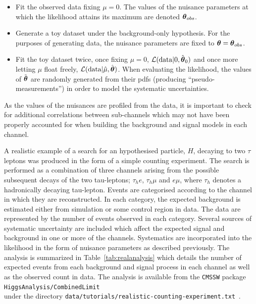 \begin{itemize}
\item{Fit the observed data fixing $\mu=0$. The values of the nuisance parameters 
at which the likelihood attains its maximum are denoted ${\boldsymbol{\theta}}_{obs}$.}
\item{Generate a toy dataset under the background-only hypothesis. For the purposes of
generating data, the nuisance parameters are fixed to ${\boldsymbol{\theta}}={\boldsymbol{\theta}}_{obs}$.}
\item{Fit the toy dataset twice, once fixing $\mu=0$, $\mathcal{L}(\mathrm{data}|0,\hat{{\boldsymbol{\theta}}}_{0})$ 
and once more letting 
$\mu$ float freely, $\mathcal{L}(\mathrm{data}|\hat{\mu},\hat{{\boldsymbol{\theta}}})$. When 
evaluating the likelihood, the values of $\tilde{{\boldsymbol{\theta}}}$ are randomly generated from their pdfs
(producing ``pseudo-measurements'') in order to model the systematic uncertainties.}
\end{itemize}
As the values of the nuisances are profiled from the data, it is important to 
check for additional correlations between sub-channels which may not have 
been properly accounted for when building the background and signal models in
each channel.

A realistic example of a search for an hypothesised particle, $H$, 
decaying to two $\tau$ leptons was produced in the form 
of a simple counting experiment. The search is performed as a combination of 
three channels arising from the possible subsequent 
decays of the two tau-leptons; $\tau_{h}e$, $\tau_{h}\mu$ and $e\mu$, where $\tau_{h}$
denotes a hadronically decaying tau-lepton. 
Events are categorised according to the channel in which they are reconstructed.
In each category, the expected background is estimated
either from simulation or some control region in data. 
The data are represented by the number of events observed in each category.
Several sources of systematic uncertainty are included which affect the
expected signal and background in one or more of the channels. 
Systematics are incorporated into the likelihood in the form of nuisance 
parameters as described previously. The analysis is summarized in 
Table~\ref{tab:realanalysis} which details the number of expected events 
from each background and signal process in each channel as well as the 
observed count in data. 
The analysis is available from the \texttt{CMSSW} package \texttt{HiggsAnalysis/CombinedLimit}\\
under the directory \texttt{data/tutorials/realistic-counting-experiment.txt}~\citep{combinationstwiki}.

